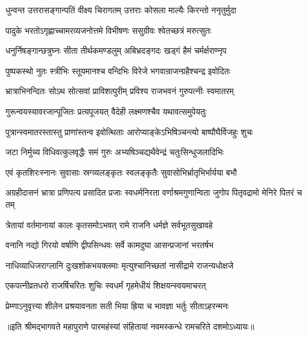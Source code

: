 \twolineshloka
{धुन्वन्त उत्तरासङ्गान्पतिं वीक्ष्य चिरागतम्}
{उत्तराः कोसला माल्यैः किरन्तो ननृतुर्मुदा} %

\twolineshloka
{पादुके भरतोऽगृह्णाच्चामरव्यजनोत्तमे}
{विभीषणः ससुग्रीवः श्वेतच्छत्रं मरुत्सुतः} %

\twolineshloka
{धनुर्निषङ्गान्छत्रुघ्नः सीता तीर्थकमण्डलुम्}
{अबिभ्रदङ्गदः खड्गं हैमं चर्मर्क्षराण्नृप} %

\twolineshloka
{पुष्पकस्थो नुतः स्त्रीभिः स्तूयमानश्च वन्दिभिः}
{विरेजे भगवान्राजन्ग्रहैश्चन्द्र इवोदितः} %

\twolineshloka
{भ्रात्राभिनन्दितः सोऽथ सोत्सवां प्राविशत्पुरीम्}
{प्रविश्य राजभवनं गुरुपत्नीः स्वमातरम्} %

\twolineshloka
{गुरून्वयस्यावरजान्पूजितः प्रत्यपूजयत्}
{वैदेही लक्ष्मणश्चैव यथावत्समुपेयतुः} %

\twolineshloka
{पुत्रान्स्वमातरस्तास्तु प्राणांस्तन्व इवोत्थिताः}
{आरोप्याङ्केऽभिषिञ्चन्त्यो बाष्पौघैर्विजहुः शुचः} %

\twolineshloka
{जटा निर्मुच्य विधिवत्कुलवृद्धैः समं गुरुः}
{अभ्यषिञ्चद्यथैवेन्द्रं चतुःसिन्धुजलादिभिः} %

\twolineshloka
{एवं कृतशिरःस्नानः सुवासाः स्रग्व्यलङ्कृतः}
{स्वलङ्कृतैः सुवासोभिर्भ्रातृभिर्भार्यया बभौ} %

\threelineshloka
{अग्रहीदासनं भ्रात्रा प्रणिपत्य प्रसादित}
{प्रजाः स्वधर्मनिरता वर्णाश्रमगुणान्विता}
{जुगोप पितृवद्रामो मेनिरे पितरं च तम्} %

\twolineshloka
{त्रेतायां वर्तमानायां कालः कृतसमोऽभवत्}
{रामे राजनि धर्मज्ञे सर्वभूतसुखावहे} %

\twolineshloka
{वनानि नद्यो गिरयो वर्षाणि द्वीपसिन्धवः}
{सर्वे कामदुघा आसन्प्रजानां भरतर्षभ} %

\twolineshloka
{नाधिव्याधिजराग्लानि दुःखशोकभयक्लमाः}
{मृत्युश्चानिच्छतां नासीद्रामे राजन्यधोक्षजे} %

\twolineshloka
{एकपत्नीव्रतधरो राजर्षिचरितः शुचिः}
{स्वधर्मं गृहमेधीयं शिक्षयन्स्वयमाचरत्} %

\twolineshloka
{प्रेम्णाऽनुवृत्त्या शीलेन प्रश्रयावनता सती}
{भिया ह्रिया च भावज्ञा भर्तुः सीताऽहरन्मनः} %

॥इति श्रीमद्भागवते महापुराणे पारमहंस्यां संहितायां नवमस्कन्धे रामचरिते दशमोऽध्यायः॥

\closesection